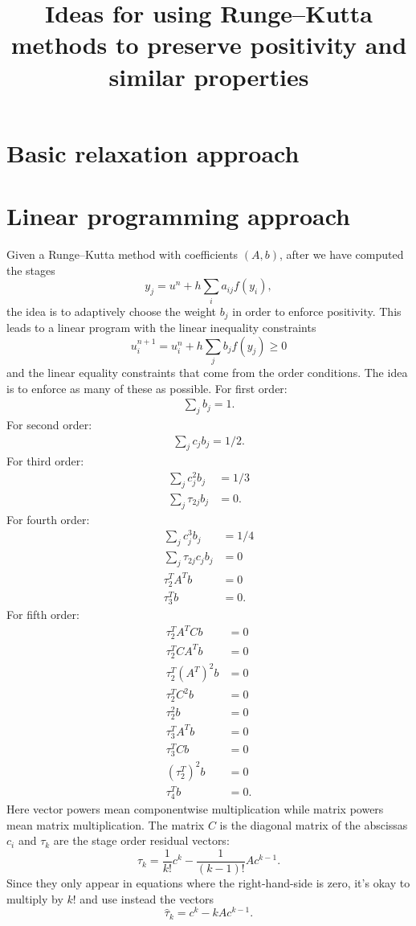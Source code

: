 \documentclass{article}
\title{Ideas for using Runge--Kutta methods to preserve positivity and similar properties}
\numberwithin{remark}{subsection}
\begin{document}
\maketitle

\section{Basic relaxation approach}

\section{Linear programming approach}
Given a Runge--Kutta method with coefficients $(A,b)$, after we have computed
the stages
$$
    y_j = u^n + h \sum_i a_{ij} f(y_i),
$$
the idea is to adaptively choose the weight $b_j$ in order to enforce positivity.
This leads to a linear program with the linear inequality constraints
$$
u^{n+1}_i = u^n_i + h \sum_j b_j f(y_j) \ge 0
$$
and the linear equality constraints that come from the order conditions.  The idea is
to enforce as many of these as possible.  For first order:
\begin{align}
\sum_j b_j = 1.
\end{align}
For second order:
\begin{align}
\sum_j c_j b_j = 1/2.
\end{align}
For third order:
\begin{align}
\sum_j c_j^2 b_j & = 1/3 \\
\sum_j \tau_{2j} b_j & = 0.
\end{align}
For fourth order:
\begin{align}
\sum_j c_j^3 b_j & = 1/4 \\
\sum_j \tau_{2j} c_j b_j & = 0 \\
\tau_{2}^T A^T b & = 0 \\
\tau_{3}^T b & = 0.
\end{align}
For fifth order:
\begin{align}
\tau_2^T A^T C b & = 0 \\
\tau_2^T C A^T b & = 0 \\
\tau_2^T (A^T)^2 b & = 0 \\
\tau_2^T C^2 b & = 0 \\
\tau_2^2 b & = 0 \\
\tau_3^T A^T b & = 0 \\
\tau_3^T C b & = 0 \\
(\tau_2^T)^2 b & = 0 \\
\tau_4^T b & = 0.
\end{align}
Here vector powers mean componentwise multiplication while
matrix powers mean matrix multiplication.  The matrix $C$ is the
diagonal matrix of the abscissas $c_i$ and
$\tau_k$ are the stage order residual vectors:
$$
    \tau_k = \frac{1}{k!} c^k - \frac{1}{(k-1)!}Ac^{k-1}.
$$
Since they only appear in equations where the right-hand-side is zero,
it's okay to multiply by $k!$ and use instead the vectors
$$
    \hat{\tau}_k = c^k - kAc^{k-1}.
$$
\end{document}
